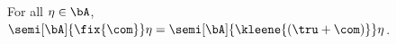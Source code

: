 

\begin{lemma}\label{le:sugar}
  For all \(\eta \in \bA\),
  \(\semi[\bA]{\fix{\com}} \eta = \semi[\bA]{\kleene{(\tru + \com)}} \eta\).
\end{lemma}

